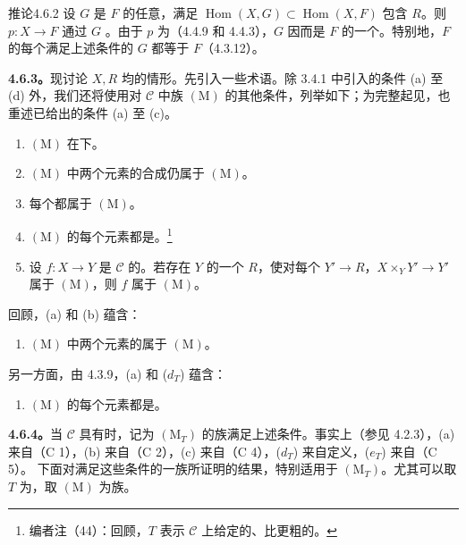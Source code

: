 \begin{SGAresult}{推论}{4.6.2}
设 $G$ 是 $F$ 的任意，满足 $\operatorname{Hom}(X,G)\subset\operatorname{Hom}(X,F)$ 包含 $R$。则 $p:X\to F$ 通过 $G$ 。由于 $p$ 为（4.4.9 和 4.4.3），$G$ 因而是 $F$ 的一个。特别地，$F$ 的每个满足上述条件的 $G$ 都等于 $F$（4.3.12）。
\end{SGAresult}
\textbf{4.6.3。}现讨论 $X,R$ 均的情形。先引入一些术语。除 3.4.1 中引入的条件 (a) 至 (d) 外，我们还将使用对 $\mathcal C$ 中族 $(\mathrm M)$ 的其他条件，列举如下；为完整起见，也重述已给出的条件 (a) 至 (c)。
\begin{enumerate}
\item[(a)] $(\mathrm M)$ 在下。
\item[(b)] $(\mathrm M)$ 中两个元素的合成仍属于 $(\mathrm M)$。
\item[(c)] 每个都属于 $(\mathrm M)$。
\item[($d_T$)] $(\mathrm M)$ 的每个元素都是。\footnote{编者注（44）：回顾，$T$ 表示 $\mathcal C$ 上给定的、比更粗的。}
\item[($e_T$)] 设 $f:X\to Y$ 是 $\mathcal C$ 的。若存在 $Y$ 的一个 $R$，使对每个 $Y'\to R$，$X\times_Y Y'\to Y'$ 属于 $(\mathrm M)$，则 $f$ 属于 $(\mathrm M)$。
\end{enumerate}
回顾，(a) 和 (b) 蕴含：
\begin{enumerate}
\item[($a'$)] $(\mathrm M)$ 中两个元素的属于 $(\mathrm M)$。
\end{enumerate}
另一方面，由 4.3.9，(a) 和 ($d_T$) 蕴含：
\begin{enumerate}
\item[($d'$)] $(\mathrm M)$ 的每个元素都是。
\end{enumerate}
\textbf{4.6.4。}当 $\mathcal C$ 具有时，记为 $(\mathrm M_T)$ 的族满足上述条件。事实上（参见 4.2.3），(a) 来自（C 1），(b) 来自（C 2），(c) 来自（C 4），($d_T$) 来自定义，($e_T$) 来自（C 5）。
下面对满足这些条件的一族所证明的结果，特别适用于 $(\mathrm M_T)$。尤其可以取 $T$ 为，取 $(\mathrm M)$ 为族。
